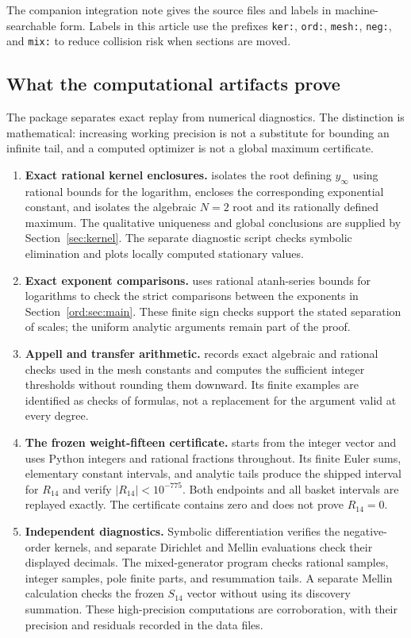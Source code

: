 The companion integration note gives the source files and labels in
machine-searchable form. Labels in this article use the prefixes
\texttt{ker:}, \texttt{ord:}, \texttt{mesh:}, \texttt{neg:}, and
\texttt{mix:} to reduce collision risk when sections are moved.

\subsection{What the computational artifacts prove}

The package separates exact replay from numerical diagnostics.
The distinction is mathematical: increasing working precision is not
a substitute for bounding an infinite tail, and a computed optimizer
is not a global maximum certificate.

\begin{enumerate}
\item \textbf{Exact rational kernel enclosures.}
   isolates the root defining $y_\infty$
  using rational bounds for the logarithm, encloses the corresponding
  exponential constant, and isolates the algebraic $N=2$ root and
  its rationally defined maximum. The qualitative uniqueness and
  global conclusions are supplied by Section~\ref{sec:kernel}.
  The separate diagnostic script checks symbolic elimination and
  plots locally computed stationary values.
\item \textbf{Exact exponent comparisons.}
   uses rational atanh-series
  bounds for logarithms to check the strict comparisons between the
  exponents in Section~\ref{ord:sec:main}. These finite sign checks
  support the stated separation of scales; the uniform analytic
  arguments remain part of the proof.
\item \textbf{Appell and transfer arithmetic.}
   records exact algebraic and rational
  checks used in the mesh constants and computes the sufficient
  integer thresholds without rounding them downward. Its finite
  examples are identified as checks of formulas, not a replacement
  for the argument valid at every degree.
\item \textbf{The frozen weight-fifteen certificate.}
   starts from the integer vector and uses
  Python integers and rational fractions throughout. Its finite
  Euler sums, elementary constant intervals, and analytic tails
  produce the shipped interval for $R_{14}$ and verify
  $|R_{14}|<10^{-775}$. Both endpoints and all basket intervals
  are replayed exactly. The certificate contains zero and does not
  prove $R_{14}=0$.
\item \textbf{Independent diagnostics.}
  Symbolic differentiation verifies the negative-order kernels,
  and separate Dirichlet and Mellin evaluations check their displayed
  decimals. The mixed-generator program checks rational samples,
  integer samples, pole finite parts, and resummation tails.
  A separate Mellin calculation checks the frozen $S_{14}$ vector
  without using its discovery summation. These high-precision
  computations are corroboration, with their precision and residuals
  recorded in the data files.
\end{enumerate}

